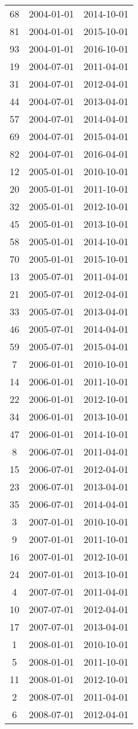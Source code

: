 \begin{tabular}{ccc}
  68 & 2004-01-01 & 2014-10-01 \\ 
  81 & 2004-01-01 & 2015-10-01 \\ 
  93 & 2004-01-01 & 2016-10-01 \\ 
  19 & 2004-07-01 & 2011-04-01 \\ 
  31 & 2004-07-01 & 2012-04-01 \\ 
  44 & 2004-07-01 & 2013-04-01 \\ 
  57 & 2004-07-01 & 2014-04-01 \\ 
  69 & 2004-07-01 & 2015-04-01 \\ 
  82 & 2004-07-01 & 2016-04-01 \\ 
  12 & 2005-01-01 & 2010-10-01 \\ 
  20 & 2005-01-01 & 2011-10-01 \\ 
  32 & 2005-01-01 & 2012-10-01 \\ 
  45 & 2005-01-01 & 2013-10-01 \\ 
  58 & 2005-01-01 & 2014-10-01 \\ 
  70 & 2005-01-01 & 2015-10-01 \\ 
  13 & 2005-07-01 & 2011-04-01 \\ 
  21 & 2005-07-01 & 2012-04-01 \\ 
  33 & 2005-07-01 & 2013-04-01 \\ 
  46 & 2005-07-01 & 2014-04-01 \\ 
  59 & 2005-07-01 & 2015-04-01 \\ 
  7 & 2006-01-01 & 2010-10-01 \\ 
  14 & 2006-01-01 & 2011-10-01 \\ 
  22 & 2006-01-01 & 2012-10-01 \\ 
  34 & 2006-01-01 & 2013-10-01 \\ 
  47 & 2006-01-01 & 2014-10-01 \\ 
  8 & 2006-07-01 & 2011-04-01 \\ 
  15 & 2006-07-01 & 2012-04-01 \\ 
  23 & 2006-07-01 & 2013-04-01 \\ 
  35 & 2006-07-01 & 2014-04-01 \\ 
  3 & 2007-01-01 & 2010-10-01 \\ 
  9 & 2007-01-01 & 2011-10-01 \\ 
  16 & 2007-01-01 & 2012-10-01 \\ 
  24 & 2007-01-01 & 2013-10-01 \\ 
  4 & 2007-07-01 & 2011-04-01 \\ 
  10 & 2007-07-01 & 2012-04-01 \\ 
  17 & 2007-07-01 & 2013-04-01 \\ 
  1 & 2008-01-01 & 2010-10-01 \\ 
  5 & 2008-01-01 & 2011-10-01 \\ 
  11 & 2008-01-01 & 2012-10-01 \\ 
  2 & 2008-07-01 & 2011-04-01 \\ 
  6 & 2008-07-01 & 2012-04-01 \\ 
   \hline
\end{tabular}
